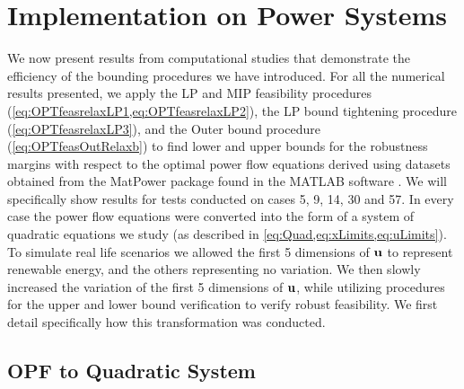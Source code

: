 \section{Implementation on Power Systems} \label{sec:numstd}  

We now present results from computational studies that demonstrate the efficiency of the bounding procedures we have introduced.
For all the numerical results presented, we apply the LP and MIP feasibility procedures (\cref{eq:OPTfeasrelaxLP1,eq:OPTfeasrelaxLP2}), the LP bound tightening procedure (\cref{eq:OPTfeasrelaxLP3}), and the Outer bound procedure (\cref{eq:OPTfeasOutRelaxb}) to find lower and upper bounds for the robustness margins with respect to the optimal power flow equations derived using datasets obtained from the MatPower package found in the MATLAB software \cite{matpower}. 
We will specifically show results for tests conducted on cases 5, 9, 14, 30 and 57. 
In every case the power flow equations were converted into the form of a system of quadratic equations we study (as described in \cref{eq:Quad,eq:xLimits,eq:uLimits}). 
To simulate real life scenarios we allowed the first 5 dimensions of $\mathbf{u}$ to represent renewable energy, and the others representing no variation. We then slowly increased the variation of the first 5 dimensions of $\mathbf{u}$, while utilizing procedures for the upper and lower bound verification to verify robust feasibility. 
We first detail specifically how this transformation was conducted.

\clearpage
\subsection{OPF to Quadratic System} \label{ssec:opf2qsys}

